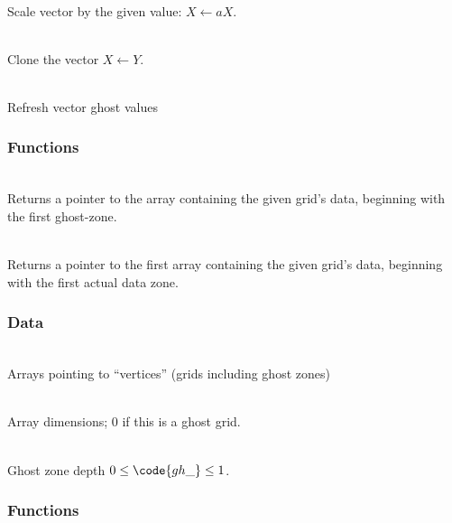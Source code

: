 \documentclass[11pt]{article}
\begin{document}
     \\
    Scale vector by the given value: $X \leftarrow a X$.

     \\
    Clone the vector $X \leftarrow Y$.

     \\
    Refresh vector ghost values

\subsubsection{ Functions}


     \\
    Returns a pointer to the array containing the given grid's data,
    beginning with the first ghost-zone.

     \\
    Returns a pointer to the first array containing the given grid's
    data, beginning with the first actual data zone.

\subsubsection{ Data}


     \\
    Arrays pointing to ``vertices'' (grids including ghost zones)

     \\
    Array dimensions; 0 if this is a ghost grid.

     \\
    Ghost zone depth $0 \le \code{gh\_} \le 1$.

\subsubsection{ Functions}
\end{document}
